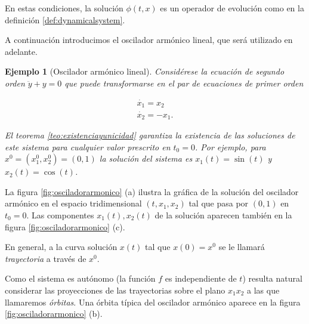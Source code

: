 \documentclass[11pt]{book}
\theoremstyle{definition}
\numberwithin{definition}{section}
\theoremstyle{theorem}
\numberwithin{theorem}{section}
\numberwithin{lemma}{section}
\numberwithin{corollary}{section}
\theoremstyle{plain}
\newtheorem{example}{Ejemplo}
\numberwithin{example}{section}
\begin{document}
En estas condiciones, la solución $\phi(t,x)$ es un operador de evolución como en la definición \ref{def:dynamicalsystem}.

A continuación introducimos el oscilador armónico lineal, que será utilizado en adelante.

\begin{example}[Oscilador armónico lineal] \label{ej:osciladorarmonico} Considérese la ecuación de segundo orden $\ddot{y} + y = 0$ que puede transformarse en el par de ecuaciones de primer orden

\begin{equation} \label{eq:osciladorarmonico}
	\begin{array}{l}
		\dot{x_1} = x_2 \\
		\dot{x_2} = -x_1.
	\end{array}
\end{equation}

El teorema \ref{teo:existenciayunicidad} garantiza la existencia de las soluciones de este sistema para cualquier valor prescrito en $t_0 = 0$. Por ejemplo, para $x^0 = (x_1^0,x_2^0) = (0,1)$ la solución del sistema es $x_1(t) = \sin(t)$ y $x_2(t) = \cos(t)$.
\end{example}

La figura \ref{fig:osciladorarmonico} (a) ilustra la gráfica de la solución del oscilador armónico en el espacio tridimensional $(t,x_1,x_2)$ tal que pasa por $(0,1)$ en $t_0 = 0$. Las componentes $x_1(t), x_2(t)$ de la solución aparecen también en la figura \ref{fig:osciladorarmonico} (c).

En general, a la curva solución $x(t)$ tal que $x(0) = x^0$ se le llamará \emph{trayectoria} a través de $x^0$.

Como el sistema es autónomo (la función $f$ es independiente de $t$) resulta natural considerar las proyecciones de las trayectorias sobre el plano $x_1x_2$ a las que llamaremos \emph{órbitas}. Una órbita típica del oscilador armónico aparece en la figura \ref{fig:osciladorarmonico} (b).
\end{document}
